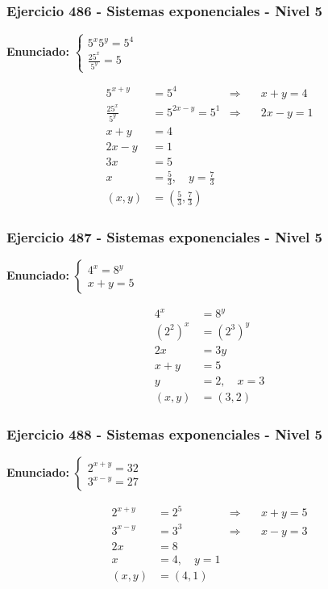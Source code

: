 \documentclass[12pt,a4paper]{article}
\begin{document}
\subsubsection*{Ejercicio 486 - Sistemas exponenciales - Nivel 5}
\textbf{Enunciado:} \(\begin{cases}5^x5^y=5^4\\ \frac{25^x}{5^y}=5\end{cases}\)

\[
\begin{aligned}
5^{x+y}&=5^4&\Rightarrow&\quad x+y=4\\
\frac{25^x}{5^y}&=5^{2x-y}=5^1&\Rightarrow&\quad 2x-y=1\\
x+y&=4\\
2x-y&=1\\
3x&=5\\
x&=\frac53,
\quad y=\frac73\\
(x,y)&=\boxed{\left(\frac53,\frac73\right)}
\end{aligned}
\]


\subsubsection*{Ejercicio 487 - Sistemas exponenciales - Nivel 5}
\textbf{Enunciado:} \(\begin{cases}4^x=8^y\\ x+y=5\end{cases}\)

\[
\begin{aligned}
4^x&=8^y\\
(2^2)^x&=(2^3)^y\\
2x&=3y\\
x+y&=5\\
y&=2,
\quad x=3\\
(x,y)&=\boxed{(3,2)}
\end{aligned}
\]


\subsubsection*{Ejercicio 488 - Sistemas exponenciales - Nivel 5}
\textbf{Enunciado:} \(\begin{cases}2^{x+y}=32\\ 3^{x-y}=27\end{cases}\)

\[
\begin{aligned}
2^{x+y}&=2^5&\Rightarrow&\quad x+y=5\\
3^{x-y}&=3^3&\Rightarrow&\quad x-y=3\\
2x&=8\\
x&=4,
\quad y=1\\
(x,y)&=\boxed{(4,1)}
\end{aligned}
\]
\end{document}
